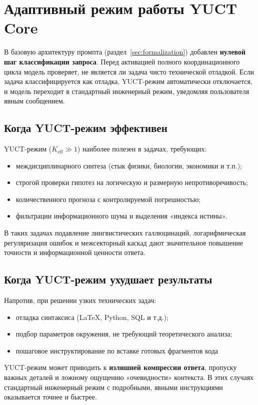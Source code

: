 \documentclass[12pt,a4paper]{article}
\begin{document}
\section{Адаптивный режим работы YUCT Core}
\label{sec:adaptive}

В базовую архитектуру промпта (раздел~\ref{sec:formalization}) добавлен \textbf{нулевой шаг классификации запроса}.  
Перед активацией полного координационного цикла модель проверяет, не является ли задача чисто технической отладкой.
Если задача классифицируется как отладка, YUCT-режим автоматически отключается, и модель переходит в стандартный инженерный режим, уведомляя пользователя явным сообщением.

\subsection{Когда YUCT-режим эффективен}
YUCT-режим (\(K_{\mathrm{eff}} \gg 1\)) наиболее полезен в задачах, требующих:
\begin{itemize}
	\item междисциплинарного синтеза (стык физики, биологии, экономики и т.п.);
	\item строгой проверки гипотез на логическую и размерную непротиворечивость;
	\item количественного прогноза с контролируемой погрешностью;
	\item фильтрации информационного шума и выделения «индекса истины».
\end{itemize}
В таких задачах подавление лингвистических галлюцинаций, логарифмическая регуляризация ошибок и межсекторный каскад дают значительное повышение точности и информационной ценности ответа.

\subsection{Когда YUCT-режим ухудшает результаты}
Напротив, при решении узких технических задач:
\begin{itemize}
	\item отладка синтаксиса (LaTeX, Python, SQL и т.д.);
	\item подбор параметров окружения, не требующий теоретического анализа;
	\item пошаговое инструктирование по вставке готовых фрагментов кода
\end{itemize}
YUCT-режим может приводить к \textbf{излишней компрессии ответа}, пропуску важных деталей и ложному ощущению «очевидности» контекста. В этих случаях стандартный инженерный режим с подробными, явными инструкциями оказывается точнее и быстрее.
\end{document}
